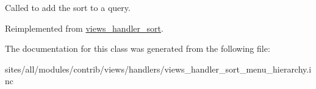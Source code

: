 Called to add the sort to a query. 

Reimplemented from \hyperlink{classviews__handler__sort_94fa33c5d037e41a927583fce2df3d18}{views\_\-handler\_\-sort}.

The documentation for this class was generated from the following file:\begin{CompactItemize}
\item 
sites/all/modules/contrib/views/handlers/views\_\-handler\_\-sort\_\-menu\_\-hierarchy.inc\end{CompactItemize}
